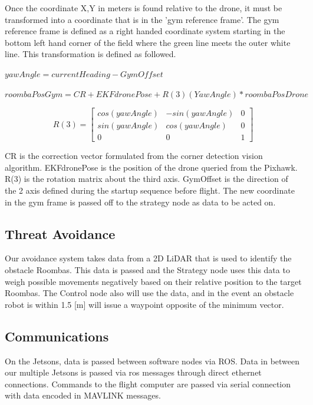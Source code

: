 \documentclass[12pt,letterpaper]{article}
\begin{document}
		Once the coordinate X,Y in meters is found relative to the drone, it must be transformed into a coordinate that is in the 'gym reference frame'. The gym reference frame is defined as a right handed coordinate system starting in the bottom left hand corner of the field where the green line meets the outer white line. This transformation is defined as followed.

		\begin{center}
			$yawAngle = currentHeading - GymOffset$
		\end{center}
		\begin{center}
			$roombaPosGym = CR + EKFdronePose + R(3)(YawAngle)*roombaPosDrone$
		\end{center}

		\[
		R(3) =
			\begin{bmatrix}
			cos(yawAngle) & -sin(yawAngle) & 0 \\
			sin(yawAngle) & cos(yawAngle)  & 0 \\
			0 & 0 & 1
			\end{bmatrix}
		\]

		CR is the correction vector formulated from the corner detection vision algorithm. EKFdronePose is the position of the drone queried from the Pixhawk. R(3) is the rotation matrix about the third axis. GymOffset is the direction of the 2 axis defined during the startup sequence before flight. The new coordinate in the gym frame is passed off to the strategy node as data to be acted on.
	\subsection*{Threat Avoidance}
		Our avoidance system takes data from a 2D LiDAR that is used to identify the obstacle Roombas. This data is passed and the Strategy node uses this data to weigh possible movements negatively based on their relative position to the target Roombas. The Control node also will use the data, and in the event an obstacle robot is within 1.5 [m] will issue a waypoint opposite of the minimum vector.

	\subsection*{Communications}
		On the Jetsons, data is passed between software nodes via ROS. Data in between our multiple Jetsons is passed via ros messages through direct ethernet connections. Commands to the flight computer are passed via serial connection with data encoded in MAVLINK messages.
\end{document}

